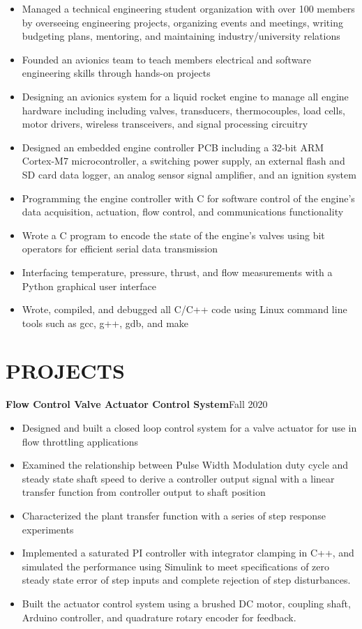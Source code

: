 \documentclass{article}
\begin{document}
\begin{itemize}
\item{Managed a technical engineering student organization with over 100 members by overseeing engineering projects, organizing events and meetings, writing budgeting plans, mentoring, and maintaining industry/university relations}
\item{Founded an avionics team to teach members electrical and software engineering skills through hands-on projects}
	\item{Designing an avionics system for a liquid rocket engine to manage all engine hardware including including valves, transducers, thermocouples, load cells, motor drivers, wireless transceivers, and signal processing circuitry}
\item{Designed an embedded engine controller PCB including a 32-bit ARM Cortex-M7 microcontroller, a switching power supply, an external flash and SD card data logger, an analog sensor signal amplifier, and an ignition system}
	\item{Programming the engine controller with C for software control of the engine's data acquisition, actuation, flow control, and communications functionality}
	\item{Wrote a C program to encode the state of the engine's valves using bit operators for efficient serial data transmission}
	\item{Interfacing temperature, pressure, thrust, and flow measurements with a Python graphical user interface}
	\item{Wrote, compiled, and debugged all C/C++ code using Linux command line tools such as gcc, g++, gdb, and make}
\end{itemize}
\section{PROJECTS}
\vspace{0.5em}
\textbf{Flow Control Valve Actuator Control System}\hfill Fall 2020
\vspace{0.5em}
\begin{itemize}
	\item Designed and built a closed loop control system for a valve actuator for use in flow throttling applications
	\item Examined the relationship between Pulse Width Modulation duty cycle and steady state shaft speed to derive a controller output signal with a linear transfer function from controller output to shaft position  
	\item Characterized the plant transfer function with a series of step response experiments
	\item  Implemented a saturated PI controller with integrator clamping in C++, and simulated the performance using Simulink to meet specifications of zero steady state error of step inputs and complete rejection of step disturbances.
	\item  Built the actuator control system using a brushed DC motor, coupling shaft, Arduino controller, and quadrature rotary encoder for feedback.
\end{itemize}
\vspace{0.5em}
\thispagestyle{empty}
\end{document}
